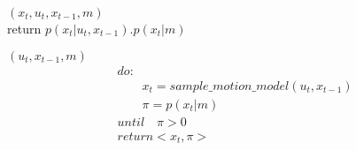  $(x_t, u_t, x_{t-1}, m)$\\
return $p(x_t | u_t, x_{t-1}).p(x_t | m)$

 $(u_t, x_{t-1}, m)$\\
\begin{align*}
	&do:\\
	& \qquad x_t = sample\_motion\_model(u_t, x_{t-1})\\
	& \qquad \pi = p(x_t | m)\\
	&until \quad \pi > 0\\
	&return <x_t, \pi>
\end{align*}